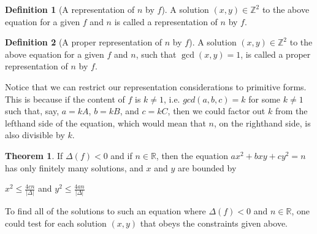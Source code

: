 \documentclass{article}
\theoremstyle{definition}
\newtheorem{definition}{Definition}[section]
\theoremstyle{theorem}
\newtheorem{theorem}{Theorem}[section]
\theoremstyle{example}
\theoremstyle{corollary}
\begin{document}
\bigskip

\theoremstyle{definition}
\begin{definition}[A representation of \(n\) by \(f\)]
A solution \((x, y) \in \mathbb{Z}^{2}\) to the above equation for a given \(f\) and \(n\) is called a representation of \(n\) by \(f\).
\end{definition}

\bigskip

\theoremstyle{definition}
\begin{definition}[A proper representation of \(n\) by \(f\)]
A solution \((x, y) \in \mathbb{Z}^{2}\) to the above equation for a given \(f\) and \(n\), such that \(\gcd(x, y) = 1\), is called a proper representation of \(n\) by \(f\).
\end{definition}

\bigskip

Notice that we can restrict our representation considerations to primitive forms. This is because if the content of \(f\) is \(k \ne 1\), i.e. \(gcd(a, b, c) = k\) for some \(k \ne 1\) such that, say, \(a = kA\), \(b = kB\), and \(c = kC\), then we could factor out \(k\) from the lefthand side of the equation, which would mean that \(n\), on the righthand side, is also divisible by \(k\).

\bigskip

\theoremstyle{theorem}
\begin{theorem}
If \(\Delta(f) < 0\) and if \(n \in \mathbb{R}\), then the equation \(ax^{2} + bxy + cy^{2} = n\) has only finitely many solutions, and \(x\) and \(y\) are bounded by
\begin{center}
\(x^{2} \le \frac{4cn}{|\Delta |}\) \quad \quad and \quad \quad \(y^{2} \le \frac{4an}{|\Delta |}\)
\end{center}
\end{theorem}

\bigskip

To find all of the solutions to such an equation where \(\Delta(f) < 0\) and \(n \in \mathbb{R}\), one could test for each solution \((x, y)\) that obeys the constraints given above.

\bigskip
\end{document}
